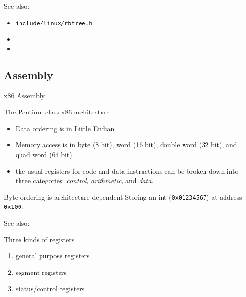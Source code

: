 See also:
\begin{itemize}
\item \texttt{include/linux/rbtree.h}  
\item {}
\item {}
\end{itemize}

\subsection{Assembly}

\begin{frame}{x86 Assembly}
  \begin{block}{The Pentium class x86 architecture}
    \begin{itemize}
    \item Data ordering is in Little Endian
    \item Memory access is in byte (8 bit), word (16 bit), double word (32 bit), and quad
      word (64 bit).
    \item the usual registers for code and data instructions can be broken down into three
      categories: \emph{control}, \emph{arithmetic}, and \emph{data}.
    \end{itemize}
  \end{block}
\end{frame}

\begin{frame}
  \begin{block}{Byte ordering is architecture dependent}
    Storing an int (\texttt{0x01234567}) at address \texttt{0x100}:
    \begin{center}
    \end{center}
  \end{block}
\end{frame}

See also: 

\begin{frame}
  \begin{center}
  \end{center}
  \begin{block}{Three kinds of registers}
    \begin{enumerate}
    \item general purpose registers
    \item segment registers
    \item status/control registers
    \end{enumerate}
  \end{block}
\end{frame}


